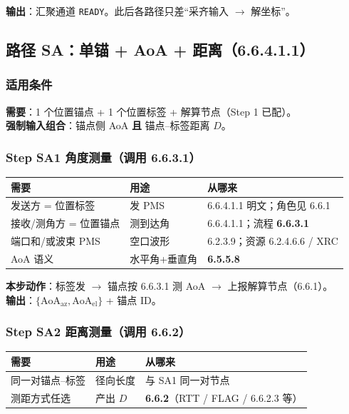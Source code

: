 \documentclass[11pt,a4paper]{ctexart}
\begin{document}
\textbf{输出}：汇聚通道 \texttt{READY}。此后各路径只差``采齐输入 $\rightarrow$ 解坐标''。

\subsection{路径 SA：单锚 + AoA + 距离（6.6.4.1.1）}
\label{sec:sa}

\subsubsection{适用条件}

\textbf{需要}：1 个位置锚点 + 1 个位置标签 + 解算节点（Step 1 已配）。\\
\textbf{强制输入组合}：锚点侧 AoA \textbf{且} 锚点--标签距离 $D$。

\subsubsection{Step SA1 角度测量（调用 6.6.3.1）}

\begin{table}[h]
\centering
\small
\begin{tabular}{L{3.4cm}L{4.8cm}L{4.8cm}}
\toprule
\textbf{需要} & \textbf{用途} & \textbf{从哪来} \\
\midrule
发送方 = 位置标签 & 发 PMS & 6.6.4.1.1 明文；角色见 6.6.1 \\
接收/测角方 = 位置锚点 & 测到达角 & 6.6.4.1.1；流程 \textbf{6.6.3.1} \\
端口和/或波束 PMS & 空口波形 & 6.2.3.9；资源 6.2.4.6.6 / XRC \\
AoA 语义 & 水平角+垂直角 & \textbf{6.5.5.8} \\
\bottomrule
\end{tabular}
\end{table}

\textbf{本步动作}：标签发 $\rightarrow$ 锚点按 6.6.3.1 测 AoA $\rightarrow$ 上报解算节点（6.6.1）。\\
\textbf{输出}：$\{\mathrm{AoA}_{\mathrm{az}},\mathrm{AoA}_{\mathrm{el}}\}$ + 锚点 ID。

\subsubsection{Step SA2 距离测量（调用 6.6.2）}

\begin{table}[h]
\centering
\small
\begin{tabular}{L{3.4cm}L{4.8cm}L{4.8cm}}
\toprule
\textbf{需要} & \textbf{用途} & \textbf{从哪来} \\
\midrule
同一对锚点--标签 & 径向长度 & 与 SA1 同一对节点 \\
测距方式任选 & 产出 $D$ & \textbf{6.6.2}（RTT / FLAG / 6.6.2.3 等） \\
\bottomrule
\end{tabular}
\end{table}
\end{document}

